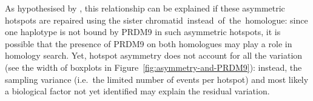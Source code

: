 As hypothesised by \citet{li2018highresolution}, this relationship can be explained if these asymmetric hotspots are repaired using the sister chromatid~instead~of~the~homologue:
since one haplotype is not bound by PRDM9 in such asymmetric hotspots, it is possible that the presence of PRDM9 on both homologues may play a role in homology search.
Yet, hotspot asymmetry does not account for all the variation (see the width of boxplots in Figure~\ref{fig:asymmetry-and-PRDM9}): 
instead, the sampling variance (i.e.\ the limited number of events per hotspot) and most likely a biological factor not yet identified may explain the residual variation.




